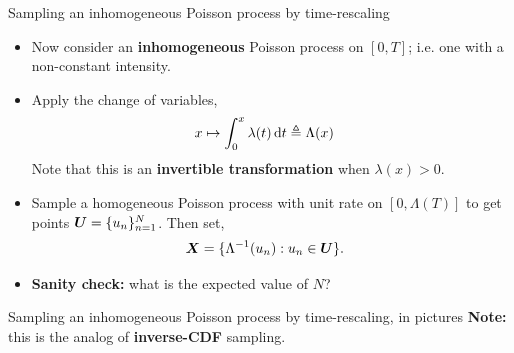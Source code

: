 \documentclass[aspectratio=169]{beamer}
\begin{document}
\begin{frame}{Sampling an inhomogeneous Poisson process by time-rescaling}
    \begin{itemize}
        \itemsep1em
        \item Now consider an \textbf{inhomogeneous} Poisson process on $[0, T]$; i.e. one with a non-constant intensity.
        
        \item<2-> Apply the change of variables,
        \begin{align}
            x &\mapsto \int_0^x \lambda(t) \mathop{}\!\mathrm{d} t \triangleq \Lambda(x)
        \end{align}
        Note that this is an \textbf{invertible transformation} when $\lambda(x) > 0$. 
        
        \item<3-> Sample a homogeneous Poisson process with unit rate on $[0, \Lambda(T)]$ to get points $\boldsymbol{U} = \{u_n\}_{n=1}^N$. Then set,
        \begin{align}
            \boldsymbol{X} &= \{\Lambda^{-1}(u_n): u_n \in \boldsymbol{U}\}.
        \end{align}
        
        \item<4-> \textbf{Sanity check:} what is the expected value of $N$?
    \end{itemize}
\end{frame}

\begin{frame}[t]{Sampling an inhomogeneous Poisson process by time-rescaling, in pictures}
    \textbf{Note:} this is the analog of \textbf{inverse-CDF} sampling.
\end{frame}
\end{document}
